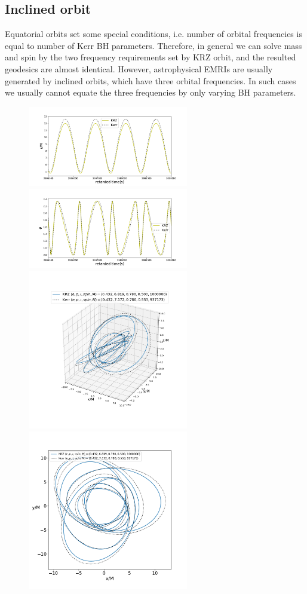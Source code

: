 \documentclass{article}
\begin{document}
\subsection{Inclined orbit}
\label{p_3d}
Equatorial orbits set some special conditions, i.e. number of orbital frequencies is equal to number of Kerr BH parameters. Therefore, in general we can solve mass and spin by the two frequency requirements set by KRZ orbit, and the resulted geodesics are almost identical. However, astrophysical EMRIs are usually generated by inclined orbits, which have three orbital frequencies. In such cases we usually cannot equate the three frequencies by only varying BH parameters. 

\begin{figure}[!ht]
	\centering
	\includegraphics[width=7cm]{r3d.pdf}
	\includegraphics[width=7cm]{th3d.pdf}
	\includegraphics[width=7cm]{trace3d.pdf}
	\includegraphics[width=7cm]{tracexy.pdf}

\end{figure}
\end{document}
